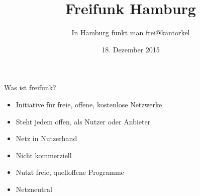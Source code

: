 \documentclass[t]{beamer}
\title{Freifunk Hamburg}
\author{In Hamburg funkt man frei\newline\newline\newline\newline\newline\newline\newline\newline @kantorkel}
\date{18. Dezember 2015}
\begin{document}
  \maketitle
  
  \begin{frame}{Was ist freifunk?}
    \begin{itemize}
      \item Initiative für freie, offene, kostenlose Netzwerke
      \item Steht jedem offen, als Nutzer oder Anbieter
      \item Netz in Nutzerhand
      \item Nicht kommerziell
      \item Nutzt freie, quelloffene Programme
      \item Netzneutral
    \end{itemize}
  \end{frame}
  
\end{document}

